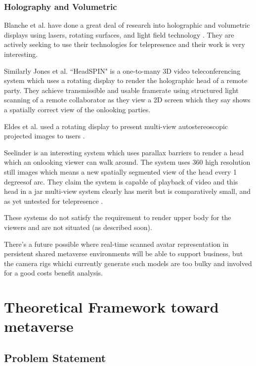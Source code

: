 \subsubsection{Holography and Volumetric}
Blanche et al. have done a great deal of research into holographic and volumetric displays using lasers, rotating surfaces, and light field technology   \cite{Blanche2010,Tay2008}. They are actively seeking to use their technologies for telepresence and their work is very interesting.\par
Similarly Jones et al. ``HeadSPIN" is a one-to-many 3D video teleconferencing system \cite{Jones2009} which uses a rotating display to render the holographic head of a remote party. They achieve transmissible and usable framerate using structured light scanning of a remote collaborator as they view a 2D screen which they say shows a spatially correct view of the onlooking parties.\par
Eldes et al. used a rotating display to present multi-view autostereoscopic projected images to users \cite{Eldes2013}.\par
Seelinder is an interesting system which uses parallax barriers to render a head which an onlooking viewer can walk around. The system uses 360 high resolution still images which means a new spatially segmented view of the head every 1 degreesof arc. They claim the system is capable of playback of video and this head in a jar multi-view system clearly has merit but is comparatively small, and as yet untested for telepresence \cite{Yendo2010}.\par
These systems do not satisfy the requirement to render upper body for the viewers and are not situated (as described soon).\par
There's a future possible where real-time scanned avatar representation in persistent shared metaverse environments will be able to support business, but the camera rigs whichi currently generate such models are too bulky and involved for a good costs benefit analysis.

\section{Theoretical Framework toward metaverse}
        
\subsection{Problem Statement}

        
